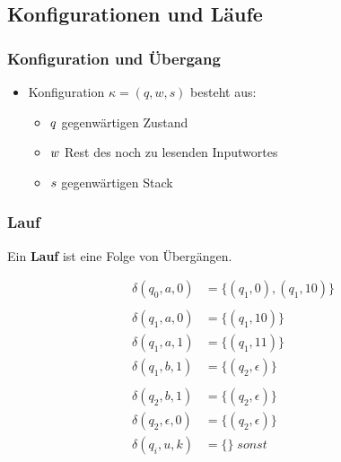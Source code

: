 \documentclass{scrartcl}
\begin{document}
\subsection{Konfigurationen und Läufe}

\subsubsection{Konfiguration und Übergang}

\begin{itemize}
	\item Konfiguration $\kappa = (q,w,s)$ besteht aus:
	\begin{itemize}
		\item $q \hfill$ gegenwärtigen Zustand
		\item $w \hfill$ Rest des noch zu lesenden Inputwortes
		\item $s \hfill$ gegenwärtigen Stack
	\end{itemize}
\end{itemize}

\subsubsection{Lauf}

Ein \textbf{Lauf} ist eine Folge von Übergängen.

\begin{align*}
	\delta(q_0,a,0) &= \{ (q_1,0),(q_1,10) \} \\\\	
	\delta(q_1,a,0) &= \{ (q_1,10) \} \\
	\delta(q_1,a,1) &= \{ (q_1,11) \} \\
	\delta(q_1,b,1) &= \{ (q_2,\epsilon) \} \\\\
	\delta(q_2,b,1) &= \{ (q_2,\epsilon) \} \\
	\delta(q_2,\epsilon,0) &= \{ (q_2,\epsilon) \} \\
	\delta(q_i,u,k) &= \{\} \; sonst \\
\end{align*}
\end{document}
